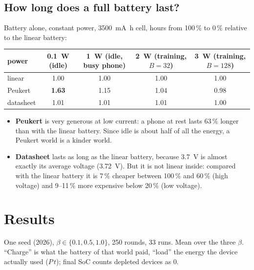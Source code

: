 \documentclass[11pt,a4paper]{article}
\begin{document}
\subsection{How long does a full battery last?}
\label{sec:physics}

Battery alone, constant power, \SI{3500}{\milli\ampere\hour} cell, hours from
100\,\% to 0\,\% relative to the linear battery:

\begin{center}
\small
\begin{tabular}{lcccc}
\toprule
power & \SI{0.1}{\watt} (idle) & \SI{1}{\watt} (idle, busy phone) & \SI{2}{\watt} (training, $B=32$) & \SI{3}{\watt} (training, $B=128$) \\
\midrule
linear    & 1.00 & 1.00 & 1.00 & 1.00 \\
Peukert   & \textbf{1.63} & 1.15 & 1.04 & 0.98 \\
datasheet & 1.01 & 1.01 & 1.01 & 1.00 \\
\bottomrule
\end{tabular}
\end{center}

\begin{itemize}
  \item \textbf{Peukert} is very generous at low current: a phone at rest lasts
        63\,\% longer than with the linear battery. Since idle is about half of
        all the energy, a Peukert world is a kinder world.
  \item \textbf{Datasheet} lasts as long as the linear battery, because
        \SI{3.7}{\volt} is almost exactly its average voltage (\SI{3.72}{\volt}).
        But it is not linear inside: compared with the linear battery it is
        7\,\% cheaper between 100\,\% and 60\,\% (high voltage) and 9--11\,\%
        more expensive below 20\,\% (low voltage).
\end{itemize}

\section{Results}
\label{sec:results}

One seed (2026), $\beta\in\{0.1, 0.5, 1.0\}$, 250 rounds, 33 runs. Mean over
the three $\beta$. \enquote{Charge} is what the battery of that world paid,
\enquote{load} the energy the device actually used ($P\,t$); final SoC counts
depleted devices as 0.
\end{document}
